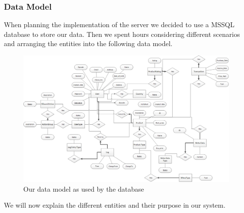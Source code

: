 \subsubsection{Data Model}
When planning the implementation of the server we decided to use a MSSQL database to store our data. Then we spent hours considering different scenarios and arranging the entities into the following data model.
\begin{figure}[H]
  \includegraphics[width=\textwidth]{illustrations/Datamodel.png}
  \caption{Our data model as used by the database}
  \label{fig:datamodel}
\end{figure}
We will now explain the different entities and their purpose in our system.

